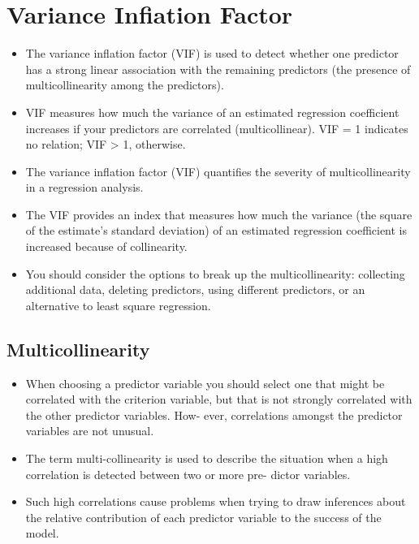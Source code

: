 \documentclass[a4paper,12pt]{article}
\begin{document}
\section*{Variance Infiation Factor}
\begin{itemize}
\item  The variance inflation factor (VIF) is used to detect whether one predictor has a strong linear association
with the remaining predictors (the presence of multicollinearity among the predictors).
\item  VIF measures how much the variance of an estimated regression coefficient increases if your predictors
are correlated (multicollinear). VIF = 1 indicates no relation; VIF > 1, otherwise.

\item  The variance inflation factor (VIF) quantifies the severity of multicollinearity in a regression analysis.
\item  The VIF provides an index that measures how much the variance (the square of the estimate's standard
deviation) of an estimated regression coefficient is increased because of collinearity.

\item  You should consider the options to break up the multicollinearity: collecting additional data, deleting predictors, using different predictors, or 
an alternative to least square regression.
\end{itemize}




\subsection*{Multicollinearity}
\begin{itemize}
\item When choosing a predictor variable you should select one that might be correlated with the
criterion variable, but that is not strongly correlated with the other predictor variables. How-
ever, correlations amongst the predictor variables are not unusual.
\item  The term multi-collinearity
is used to describe the situation when a high correlation is detected between two or more pre-
dictor variables. 
\item Such high correlations cause problems when trying to draw inferences about
the relative contribution of each predictor variable to the success of the model.
\end{itemize}
\end{document}
